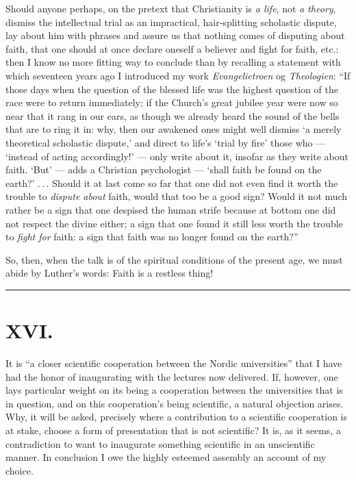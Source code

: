 \documentclass[12pt]{book}
\newcommand{\opage}[1]{\marginnote{\footnotesize\textit{[#1]}}}
\begin{document}
Should anyone perhaps, on the pretext that Christianity is \emph{a life}, not
\emph{a theory}, dismiss the intellectual trial as an impractical,
hair-splitting scholastic dispute, lay about him with phrases and assure us
that nothing comes of disputing about faith, that one should at once declare
oneself a believer and fight for faith, etc.: then I know no more fitting way
to conclude than by recalling a statement with which seventeen years ago I
introduced my work \emph{Evangelietroen} og \emph{Theologien}: ``If those days
when the question of the blessed life was the highest question of the race
were to return immediately; if the Church's great jubilee year were now so
near that it rang in our ears, as though we already heard the sound of the
bells that are to ring it in: why, then our awakened ones might well dismiss
`a merely theoretical
\opage{278}\setcounter{footnote}{0}%
scholastic dispute,' and direct to life's `trial by fire' those who ---
`instead of acting accordingly!' --- only write about it, insofar as they
write about faith. `But' --- adds a Christian psychologist --- `shall faith be
found on the earth?' .\,.\,. Should it at last come so far that one did not
even find it worth the trouble to \emph{dispute about} faith, would that too be
a good sign? Would it not much rather be a sign that one despised the human
strife because at bottom one did not respect the divine either; a sign that
one found it still less worth the trouble to \emph{fight for} faith: a sign
that faith was no longer found on the earth?''

So, then, when the talk is of the spiritual conditions of the present age, we
must abide by Luther's words: Faith is a restless thing!

\begin{center}\rule{3cm}{0.4pt}\end{center}

\chapter*{XVI.}
\label{ch:xvi}
\opage{279}\setcounter{footnote}{0}%
It is ``a closer scientific cooperation between the Nordic universities''
that I have had the honor of inaugurating with the lectures now delivered.
If, however, one lays particular weight on its being a cooperation between
the universities that is in question, and on this cooperation's being
scientific, a natural objection arises. Why, it will be asked, precisely
where a contribution to a scientific cooperation is at stake, choose a
form of presentation that is not scientific? It is, as it seems, a
contradiction to want to inaugurate something scientific in an unscientific
manner. In conclusion I owe the highly esteemed assembly an account of my
choice.
\end{document}
